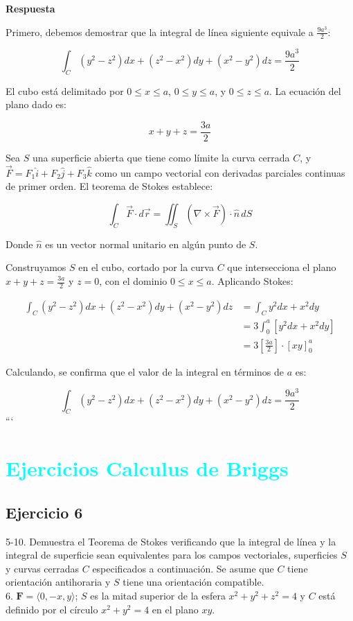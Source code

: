 \documentclass{report}
\begin{document}
\textbf{Respuesta}

Primero, debemos demostrar que la integral de línea siguiente equivale a \( \frac{9a^3}{2} \):

\[
\int_C \left( y^2 - z^2 \right) dx + \left( z^2 - x^2 \right) dy + \left( x^2 - y^2 \right) dz = \frac{9a^3}{2}
\]

El cubo está delimitado por \( 0 \leq x \leq a \), \( 0 \leq y \leq a \), y \( 0 \leq z \leq a \). La ecuación del plano dado es:

\[
x + y + z = \frac{3a}{2}
\]

Sea \( S \) una superficie abierta que tiene como límite la curva cerrada \( C \), y \( \vec{F} = F_1 \hat{i} + F_2 \hat{j} + F_3 \hat{k} \) como un campo vectorial con derivadas parciales continuas de primer orden. El teorema de Stokes establece:

\[
\int_C \vec{F} \cdot d\vec{r} = \iint_S (\nabla \times \vec{F}) \cdot \hat{n} \, dS
\]

Donde \( \hat{n} \) es un vector normal unitario en algún punto de \( S \).

Construyamos \( S \) en el cubo, cortado por la curva \( C \) que intersecciona el plano \( x + y + z = \frac{3a}{2} \) y \( z = 0 \), con el dominio \( 0 \leq x \leq a \). Aplicando Stokes:

\[
\begin{aligned}
\int_C \left( y^2 - z^2 \right) dx + \left( z^2 - x^2 \right) dy + \left( x^2 - y^2 \right) dz
& = \int_C y^2 dx + x^2 dy \\
& = 3 \int_0^a \left[ y^2 dx + x^2 dy \right] \\
& = 3 \left[ \frac{3a}{2} \right] \cdot [xy]_0^a
\end{aligned}
\]

Calculando, se confirma que el valor de la integral en términos de \( a \) es:

\[
\int_C \left( y^2 - z^2 \right) dx + \left( z^2 - x^2 \right) dy + \left( x^2 - y^2 \right) dz = \frac{9a^3}{2}
\]
```

\section*{\textcolor{cyan}{Ejercicios Calculus de Briggs}}
\subsection*{Ejercicio 6}
5-10. Demuestra el Teorema de Stokes verificando que la integral de línea y la integral de superficie sean equivalentes para los campos vectoriales, superficies \( S \) y curvas cerradas \( C \) especificados a continuación. Se asume que \( C \) tiene orientación antihoraria y \( S \) tiene una orientación compatible.\\
6. \( \mathbf{F}=\langle 0,-x, y\rangle \); \( S \) es la mitad superior de la esfera \( x^2+y^2+z^2=4 \) y \( C \) está definido por el círculo \( x^2+y^2=4 \) en el plano \( xy \).
\end{document}
